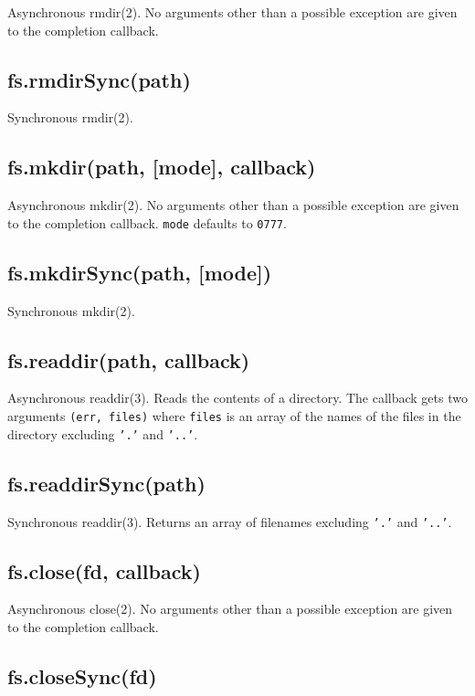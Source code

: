 Asynchronous rmdir(2). No arguments other than a possible exception are
given to the completion callback.

\subsection{fs.rmdirSync(path)}

Synchronous rmdir(2).

\subsection{fs.mkdir(path, {[}mode{]}, callback)}

Asynchronous mkdir(2). No arguments other than a possible exception are
given to the completion callback. \texttt{mode} defaults to
\texttt{0777}.

\subsection{fs.mkdirSync(path, {[}mode{]})}

Synchronous mkdir(2).

\subsection{fs.readdir(path, callback)}

Asynchronous readdir(3). Reads the contents of a directory. The callback
gets two arguments \texttt{(err, files)} where \texttt{files} is an
array of the names of the files in the directory excluding \texttt{'.'}
and \texttt{'..'}.

\subsection{fs.readdirSync(path)}

Synchronous readdir(3). Returns an array of filenames excluding
\texttt{'.'} and \texttt{'..'}.

\subsection{fs.close(fd, callback)}

Asynchronous close(2). No arguments other than a possible exception are
given to the completion callback.

\subsection{fs.closeSync(fd)}

